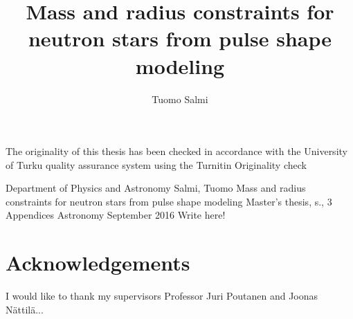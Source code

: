 \documentclass{wihuri}
\begin{document}


\title{Mass and radius constraints for neutron stars
from pulse shape modeling}
\author{Tuomo Salmi}

\maketitle
\newpage
\thispagestyle{empty}
\vspace*{10cm}

\vfill

  
\hspace*{-2cm}\parbox{\textwidth}{The originality of this thesis has been checked in accordance with the University of Turku quality assurance system using the Turnitin Originality check}
  


\newpage


\begin{tiivistelma}%
        {Department of Physics and Astronomy}%
        {Salmi, Tuomo}%
        {Mass and radius constraints for neutron stars
from pulse shape modeling}
        {Master's thesis, \pageref{LastPage} s., 3 Appendices}%
        {Astronomy}%
        {September 2016}%
	Write here!
\end{tiivistelma}

\section*{Acknowledgements}
I would like to thank my supervisors Professor Juri Poutanen and Joonas Nättilä...
\newpage
\end{document}
